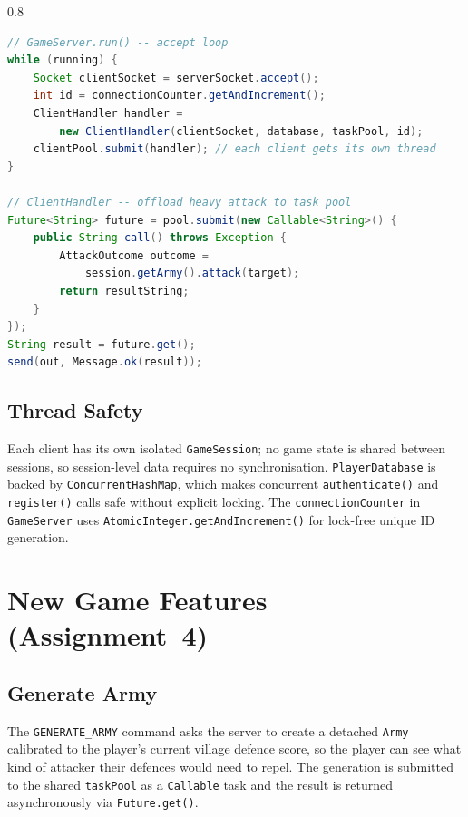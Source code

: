 \documentclass[format=acmsmall, review=false, screen=true]{acmart}
\begin{document}
\begin{spacing}{0.8}
\begin{lstlisting}[language=Java, caption={Server accept loop and thread pool submission.},
                   label=lst:threads]
// GameServer.run() -- accept loop
while (running) {
    Socket clientSocket = serverSocket.accept();
    int id = connectionCounter.getAndIncrement();
    ClientHandler handler =
        new ClientHandler(clientSocket, database, taskPool, id);
    clientPool.submit(handler); // each client gets its own thread
}

// ClientHandler -- offload heavy attack to task pool
Future<String> future = pool.submit(new Callable<String>() {
    public String call() throws Exception {
        AttackOutcome outcome =
            session.getArmy().attack(target);
        return resultString;
    }
});
String result = future.get();
send(out, Message.ok(result));
\end{lstlisting}
\end{spacing}

\subsection{Thread Safety}

Each client has its own isolated \texttt{GameSession}; no game state is shared
between sessions, so session-level data requires no synchronisation.
\texttt{PlayerDatabase} is backed by \texttt{ConcurrentHashMap}, which makes
concurrent \texttt{authenticate()} and \texttt{register()} calls safe without
explicit locking.  The \texttt{connectionCounter} in \texttt{GameServer} uses
\texttt{AtomicInteger.getAndIncrement()} for lock-free unique ID generation.

\section{New Game Features (Assignment~4)}

\subsection{Generate Army}

The \texttt{GENERATE\_ARMY} command asks the server to create a detached
\texttt{Army} calibrated to the player's current village defence score, so the
player can see what kind of attacker their defences would need to repel.  The
generation is submitted to the shared \texttt{taskPool} as a \texttt{Callable}
task and the result is returned asynchronously via \texttt{Future.get()}.
\end{document}
